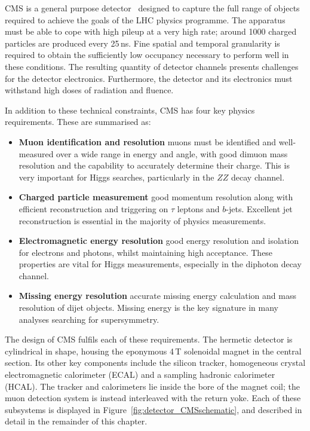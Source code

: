 CMS is a general purpose detector~\cite{CMSdetector} designed to capture the full range of objects required to achieve the goals of the LHC physics programme.
The apparatus must be able to cope with high pileup at a very high rate; around 1000 charged particles are produced every 25\,ns.
Fine spatial and temporal granularity is required to obtain the sufficiently low occupancy necessary to perform well in these conditions.
The resulting quantity of detector channels presents challenges for the detector electronics.
Furthermore, the detector and its electronics must withstand high doses of radiation and fluence.

In addition to these technical constraints, CMS has four key physics requirements.
These are summarised as:
\begin{itemize}
  \item{\textbf{Muon identification and resolution} 
  muons must be identified and well-measured over a wide range in energy and angle, 
  with good dimuon mass resolution and the capability to accurately determine their charge.
  This is very important for Higgs searches, particularly in the $ZZ$ decay channel.}
  \item{\textbf{Charged particle measurement}
  good momentum resolution along with efficient reconstruction and triggering on $\tau$ leptons and $b$-jets.
  Excellent jet reconstruction is essential in the majority of physics measurements.}
  \item{\textbf{Electromagnetic energy resolution}
  good energy resolution and isolation for electrons and photons, whilst maintaining high acceptance.
  These properties are vital for Higgs measurements, especially in the diphoton decay channel.}
  \item{\textbf{Missing energy resolution}
  accurate missing energy calculation and mass resolution of dijet objects.
  Missing energy is the key signature in many analyses searching for supersymmetry.}
\end{itemize}

The design of CMS fulfils each of these requirements.
The hermetic detector is cylindrical in shape, housing the eponymous 4\,T solenoidal magnet in the central section.
Its other key components include the silicon tracker, homogeneous crystal electromagnetic calorimeter (ECAL) and a sampling hadronic calorimeter (HCAL).
The tracker and calorimeters lie inside the bore of the magnet coil; the muon detection system is instead interleaved with the return yoke.
Each of these subsystems is displayed in Figure~\ref{fig:detector_CMSschematic}, and described in detail in the remainder of this chapter.

